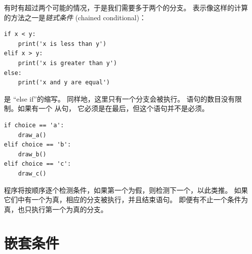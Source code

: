 {{{{  
  


有时有超过两个可能的情况，于是我们需要多于两个的分支。
表示像这样的计算的方法之一是{\em 链式条件} (chained conditional)：

\begin{lstlisting}
if x < y:
    print('x is less than y')
elif x > y:
    print('x is greater than y')
else:
    print('x and y are equal')
\end{lstlisting}

%

 是 ``else if''的缩写。 同样地，这里只有一个分支会被执行。
 语句的数目没有限制。如果有一个  从句，
它必须是在最后，但这个语句并不是必须。
  

\begin{lstlisting}
if choice == 'a':
    draw_a()
elif choice == 'b':
    draw_b()
elif choice == 'c':
    draw_c()
\end{lstlisting}

%

程序将按顺序逐个检测条件，如果第一个为假，则检测下一个，以此类推。
如果它们中有一个为真，相应的分支被执行，并且结束语句。
即便有不止一个条件为真，也只执行第一个为真的分支。

\section{嵌套条件}

  

}}}}
